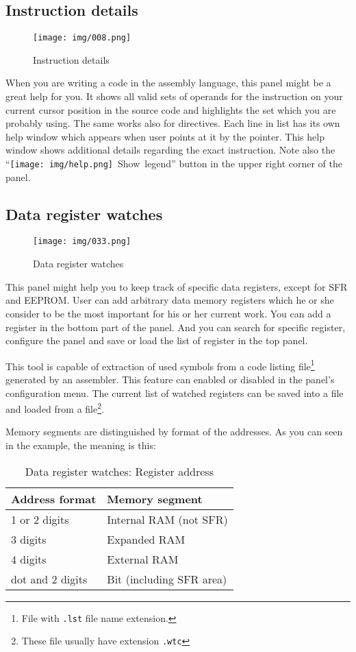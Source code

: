 \documentclass[a4paper,twoside,12pt]{book}
\newcommand{\fileextension}[1]{\texttt{#1}}
\newcommand{\mysmallfont}{\fontsize{8pt}{10pt} \selectfont{}}
\begin{document}
		\subsection{Instruction details}
			\begin{wrapfigure}{r}{210pt}
				\centering{}
				\texttt{[image: img/008.png]}
				\caption{Instruction details}
			\end{wrapfigure}
			When you are writing a code in the assembly language, this panel might be a great help for you. It shows all valid sets of operands for the instruction on your current cursor position in the source code and highlights the set which you are probably using. The same works also for directives. Each line in list has its own help window which appears when user points at it by the pointer. This help window shows additional details regarding the exact instruction. Note also the ``\texttt{[image: img/help.png]}~Show~legend'' button in the upper right corner of the panel.

		\subsection{Data register watches}
			\begin{wrapfigure}{l}{130pt}
				\centering{}
				\texttt{[image: img/033.png]}
				\caption{Data register watches}
			\end{wrapfigure}
			This panel might help you to keep track of specific data registers, except for SFR and EEPROM. User can add arbitrary data memory registers which he or she consider to be the most important for his or her current work. You can add a register in the bottom part of the panel. And you can search for specific register, configure the panel and save or load the list of register in the top panel.

			This tool is capable of extraction of used symbols from a code listing file\footnote{File with \fileextension{.lst} file name extension.} generated by an assembler. This feature can enabled or disabled in the panel's configuration menu. The current list of watched registers can be saved into a file and loaded from a file\footnote{These file usually have extension \fileextension{.wtc}}.

			Memory segments are distinguished by format of the addresses. As you can seen in the example, the meaning is this:
			\begin{table}[h!]
				\mysmallfont{}
				\centering{}
				\begin{tabular}{l|l}
					\textbf{Address format}	& \textbf{Memory segment}	\\
					\hline
					1 or 2 digits		& Internal RAM (not SFR)	\\
					3 digits		& Expanded RAM			\\
					4 digits		& External RAM			\\
					dot and 2 digits	& Bit (including SFR area)	\\
				\end{tabular}
				\caption{Data register watches: Register address}
			\end{table}
\end{document}
